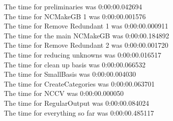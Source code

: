 \documentclass[rep10,leqno]{report}
\begin{document}
\noindent
The time for preliminaries was 0:00:00.042694\\
The time for NCMakeGB 1 was 0:00:00.001576\\
The time for Remove Redundant 1 was 0:00:00.000911\\
The time for the main NCMakeGB was 0:00:00.184892\\
The time for Remove Redundant 2 was 0:00:00.001720\\
The time for reducing unknowns was 0:00:00.016517\\
The time for clean up basis was 0:00:00.066532\\
The time for SmallBasis was 0:00:00.004030\\
The time for CreateCategories was 0:00:00.063701\\
The time for NCCV was 0:00:00.000050\\
The time for RegularOutput was 0:00:00.084024\\
The time for everything so far was 0:00:00.485117\\
\end{document}

